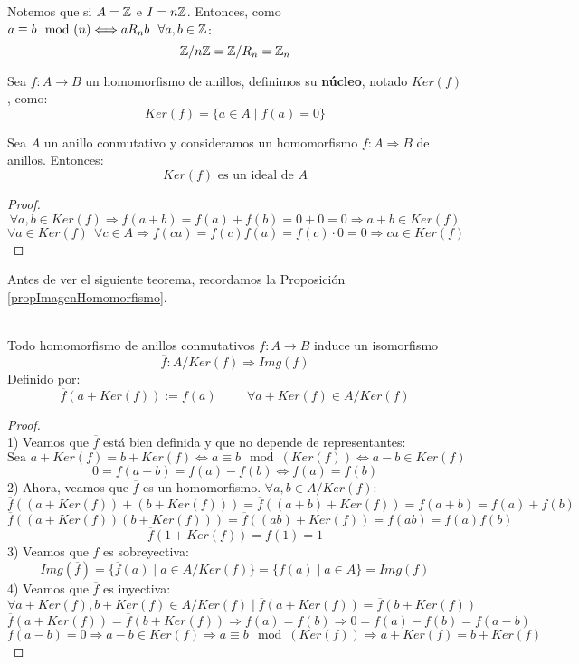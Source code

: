 \noindent
Notemos que si $A=\mathbb Z$ e $I=n\mathbb Z$. \newline Entonces, como $a\equiv b\mod(n)\Longleftrightarrow aR_nb~~\forall a,b \in \mathbb Z$:
$$\mathbb Z/n\mathbb Z = \mathbb Z/R_n = \mathbb Z_n$$

\begin{definicion}
    Sea $f:A\rightarrow B$ un homomorfismo de anillos, definimos su \textbf{núcleo}, notado $Ker(f)$, como:
    $$Ker(f) = \{a \in A \mid f(a) = 0\}$$
\end{definicion}

\begin{prop}
    Sea $A$ un anillo conmutativo y consideramos un homomorfismo $f:A\Longrightarrow B$ de anillos. Entonces:
    $$Ker(f) \mbox{ es un ideal de } A$$
\begin{proof}
    $$\forall a,b \in Ker(f) \Longrightarrow f(a+b) = f(a)+f(b) = 0+0 = 0 \Longrightarrow a+b \in Ker(f)$$
    $$\forall a \in Ker(f)~~\forall c\in A \Longrightarrow f(ca) = f(c)f(a) = f(c)\cdot 0 = 0 \Longrightarrow ca \in Ker(f)$$
\end{proof}
\end{prop}



Antes de ver el siguiente teorema, recordamos la Proposición \ref{propImagenHomomorfismo}.

\begin{teo}
    \ \\
    Todo homomorfismo de anillos conmutativos $f:A\rightarrow B$ induce un isomorfismo
    $$\overline{f}:A/Ker(f)\Longrightarrow Img(f)$$
    Definido por:
    $$\overline{f}(a+Ker(f)) := f(a)\hspace{1cm}\forall a+Ker(f) \in A/Ker(f)$$
\begin{proof}
    \ \\
    1) Veamos que $\overline{f}$ está bien definida y que no depende de representantes:
    $$\mbox{Sea } a+Ker(f) = b+Ker(f) \Longleftrightarrow a\equiv b\mod(Ker(f)) \Longleftrightarrow a-b \in Ker(f)$$
    $$0 = f(a-b) = f(a)-f(b) \Longleftrightarrow f(a) = f(b)$$
    2) Ahora, veamos que $\overline{f}$ es un homomorfismo. $\forall a,b \in A/Ker(f)$:
    $$\overline{f}((a+Ker(f))+(b+Ker(f))) = \overline{f}((a+b)+Ker(f)) = f(a+b) = f(a)+f(b)$$
    $$\overline{f}((a+Ker(f))(b+Ker(f))) = \overline{f}((ab)+Ker(f)) = f(ab) = f(a)f(b)$$
    $$\overline{f}(1+Ker(f)) = f(1) = 1$$
    3) Veamos que $\overline{f}$ es sobreyectiva:
    $$Img(\overline{f}) = \{\overline{f}(a) \mid a \in A/Ker(f)\} = \{f(a) \mid a \in A\} = Img(f)$$
    4) Veamos que $\overline{f}$ es inyectiva:
    $$\forall a+Ker(f),b+Ker(f) \in A/Ker(f) \mid \overline{f}(a+Ker(f)) = \overline{f}(b+Ker(f))$$
    $$\overline{f}(a+Ker(f)) = \overline{f}(b+Ker(f)) \Longrightarrow f(a)=f(b) \Longrightarrow 0=f(a)-f(b) = f(a-b)$$
    $$f(a-b)=0 \Longrightarrow a-b \in Ker(f) \Longrightarrow a\equiv b\mod(Ker(f)) \Longrightarrow a+Ker(f)=b+Ker(f)$$
\end{proof}
\end{teo}

